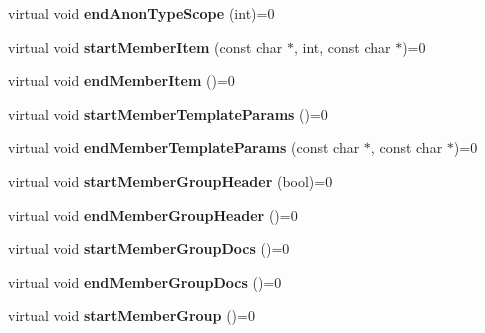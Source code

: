 \begin{DoxyCompactItemize}
\item 
\mbox{\label{class_output_generator_a3cf66346a0594b1987811bc258b598f6}} 
virtual void {\bfseries end\+Anon\+Type\+Scope} (int)=0
\item 
\mbox{\label{class_output_generator_a626142e0dd357e23058573aff5299eb6}} 
virtual void {\bfseries start\+Member\+Item} (const char $\ast$, int, const char $\ast$)=0
\item 
\mbox{\label{class_output_generator_aac81201cfd0dedc7635bc81913906335}} 
virtual void {\bfseries end\+Member\+Item} ()=0
\item 
\mbox{\label{class_output_generator_af221e843bf8828e9dcb45faea48c8af2}} 
virtual void {\bfseries start\+Member\+Template\+Params} ()=0
\item 
\mbox{\label{class_output_generator_a0175d6eb2630de31743136c083d0cb84}} 
virtual void {\bfseries end\+Member\+Template\+Params} (const char $\ast$, const char $\ast$)=0
\item 
\mbox{\label{class_output_generator_aea2631f3e52efb116a4b3375755024c8}} 
virtual void {\bfseries start\+Member\+Group\+Header} (bool)=0
\item 
\mbox{\label{class_output_generator_a585ab0b649dad9edf7b78e8f1ec20885}} 
virtual void {\bfseries end\+Member\+Group\+Header} ()=0
\item 
\mbox{\label{class_output_generator_a0b3d9ddaa7d63cea43081ac17ce5e96b}} 
virtual void {\bfseries start\+Member\+Group\+Docs} ()=0
\item 
\mbox{\label{class_output_generator_a7debb7a4d6584e8855e7dc9ce0594d99}} 
virtual void {\bfseries end\+Member\+Group\+Docs} ()=0
\item 
\mbox{\label{class_output_generator_a1cc976995007c64aa044d98da900d09f}} 
virtual void {\bfseries start\+Member\+Group} ()=0
\item 
\mbox{\label{class_output_generator_a6b020947c7d4cd3a2d2d8c0993fbb4e3}} 

\end{DoxyCompactItemize}
